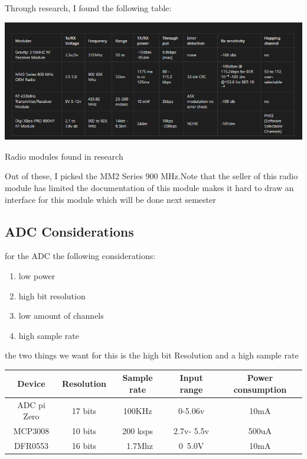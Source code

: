 Through research, I found the following table:
\begin{table}[h!]
	\centering
	\includegraphics[width=0.5\linewidth]{Images/radiomoudles.png}
		
	\caption{Radio modules found in research}
	\label{Radio modules found in research}
	
\end{table}

Out of these, I picked the MM2 Series 900 MHz\cite{freewave}.Note that the seller of this  radio module has  limited the documentation  of this module makes it hard to  draw an interface for this module which will be done  next  semester
\subsection{ADC Considerations}
\label{Adc section}
for the ADC  the following considerations:
\begin{enumerate}
	\item low power
	\item high bit resolution
	\item low amount of channels
	\item high sample rate
\end{enumerate}
the two things we  want  for this is the high bit  Resolution  and  a  high sample rate
\begin{table}[h!]
	\begin{center}
		\begin{tabular}{|c|c|c|c|c|}
			\hline
			Device & Resolution & Sample rate & Input range & Power consumption \\
			\hline
			ADC pi Zero & 17 bits & 100KHz & 0-5.06v & 10mA \\
			MCP3008 & 10 bits & 200 ksps & 2.7v- 5.5v & 500uA \\
			DFR0553 & 16 bits & ~1.7Mhz & 0~5.0V&10mA\\
			\hline
		\end{tabular}
	\end{center}
\end{table}

